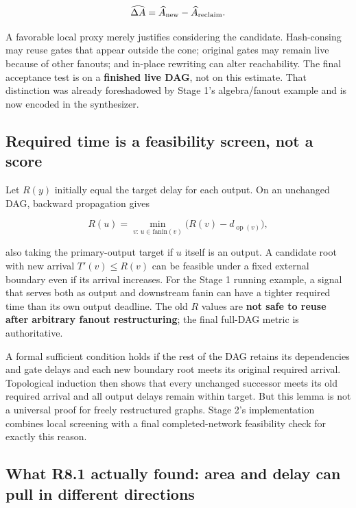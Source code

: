 \[
\widehat{\Delta A}=\widehat A_{\rm new}-\widehat A_{\rm reclaim}.
\]

A favorable local proxy merely justifies considering the candidate. Hash-consing may reuse gates that appear outside the cone; original gates may remain live because of other fanouts; and in-place rewriting can alter reachability. The final acceptance test is on a \textbf{finished live DAG}, not on this estimate. That distinction was already foreshadowed by Stage 1's algebra/fanout example and is now encoded in the synthesizer.

\subsection{Required time is a feasibility screen, not a score}\label{required-time-is-a-feasibility-screen-not-a-score}

Let \(R(y)\) initially equal the target delay for each output. On an unchanged DAG, backward propagation gives

\[
R(u)=\min_{v:\,u\in\mathrm{fanin}(v)}\bigl(R(v)-d_{\operatorname{op}(v)}\bigr),
\]

also taking the primary-output target if \(u\) itself is an output. A candidate root with new arrival \(T'(v)\le R(v)\) can be feasible under a fixed external boundary even if its arrival increases. For the Stage 1 running example, a signal that serves both as output and downstream fanin can have a tighter required time than its own output deadline. The old \(R\) values are \textbf{not safe to reuse after arbitrary fanout restructuring}; the final full-DAG metric is authoritative.

A formal sufficient condition holds if the rest of the DAG retains its dependencies and gate delays and each new boundary root meets its original required arrival. Topological induction then shows that every unchanged successor meets its old required arrival and all output delays remain within target. But this lemma is not a universal proof for freely restructured graphs. Stage 2's implementation combines local screening with a final completed-network feasibility check for exactly this reason.

\subsection{What R8.1 actually found: area and delay can pull in different directions}\label{what-r8.1-actually-found-area-and-delay-can-pull-in-different-directions}

